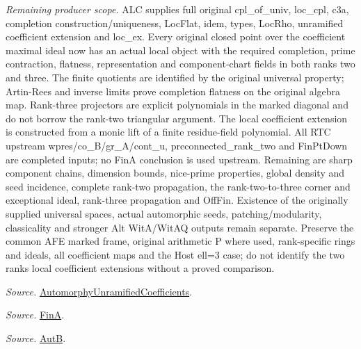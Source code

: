 \documentclass[11pt,a4paper]{article}
\numberwithin{equation}{section}
\theoremstyle{remark}\newtheorem{remark}[theorem]{Remark}
\begin{document}
\emph{Remaining producer scope.} ALC supplies full original cpl\_\allowbreak of\_\allowbreak univ, loc\_\allowbreak cpl, c3a, completion construction/uniqueness, LocFlat, idem, types, LocRho, unramified coefficient extension and loc\_\allowbreak ex. Every original closed point over the coefficient maximal ideal now has an actual local object with the required completion, prime contraction, flatness, representation and component-chart fields in both ranks two and three. The finite quotients are identified by the original universal property; Artin-Rees and inverse limits prove completion flatness on the original algebra map. Rank-three projectors are explicit polynomials in the marked diagonal and do not borrow the rank-two triangular argument. The local coefficient extension is constructed from a monic lift of a finite residue-field polynomial. All RTC upstream wpres/co\_\allowbreak B/gr\_\allowbreak A/cont\_\allowbreak u, preconnected\_\allowbreak rank\_\allowbreak two and FinPtDown are completed inputs; no FinA conclusion is used upstream. Remaining are sharp component chains, dimension bounds, nice-prime properties, global density and seed incidence, complete rank-two propagation, the rank-two-to-three corner and exceptional ideal, rank-three propagation and OffFin. Existence of the originally supplied universal spaces, actual automorphic seeds, patching/modularity, classicality and stronger Alt WitA/WitAQ outputs remain separate. Preserve the common AFE marked frame, original arithmetic P where used, rank-specific rings and ideals, all coefficient maps and the Host ell=3 case; do not identify the two ranks local coefficient extensions without a proved comparison.

\emph{Source.} \href{https://github.com/CocoSgt/riemann-hypothesis-lean/blob/7cbf7a0c32fca1badf05931879a37c3f8a2b03b4/src/Development/AutomorphicArithmetic/AutomorphicVarieties/AutomorphicCases/AutomorphyUnramifiedCoefficients.lean#L24-L27}{AutomorphyUnramifiedCoefficients}.

\emph{Source.} \href{https://github.com/CocoSgt/riemann-hypothesis-lean/blob/7cbf7a0c32fca1badf05931879a37c3f8a2b03b4/src/Development/AutomorphicArithmetic/AutomorphicVarieties/AutomorphicCases/AutomorphyUnramifiedCoefficients.lean#L12-L13}{FinA}.

\emph{Source.} \href{https://github.com/CocoSgt/riemann-hypothesis-lean/blob/7cbf7a0c32fca1badf05931879a37c3f8a2b03b4/src/Development/AutomorphicArithmetic/AutomorphicVarieties/AutomorphicCases/AutomorphyUnramifiedCoefficients.lean#L15-L17}{AutB}.
\end{document}
